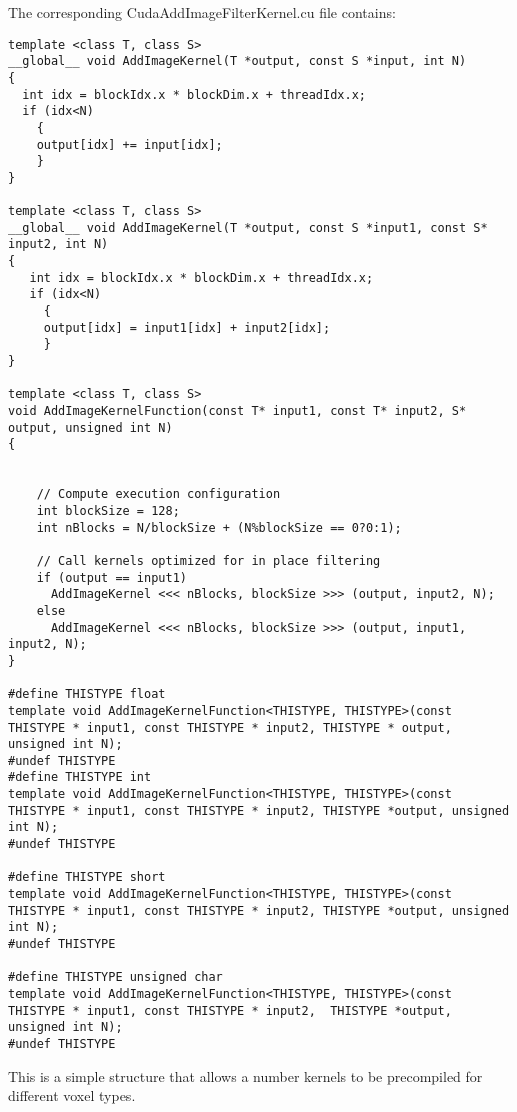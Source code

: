 \documentclass{InsightArticle}
\begin{document}
The corresponding CudaAddImageFilterKernel.cu file contains:
\begin{verbatim}
template <class T, class S>
__global__ void AddImageKernel(T *output, const S *input, int N)
{
  int idx = blockIdx.x * blockDim.x + threadIdx.x;
  if (idx<N) 
    {
    output[idx] += input[idx];
    }
}

template <class T, class S>
__global__ void AddImageKernel(T *output, const S *input1, const S* input2, int N)
{
   int idx = blockIdx.x * blockDim.x + threadIdx.x;
   if (idx<N) 
     {
     output[idx] = input1[idx] + input2[idx];
     }
}

template <class T, class S>
void AddImageKernelFunction(const T* input1, const T* input2, S* output, unsigned int N)
{


    // Compute execution configuration 
    int blockSize = 128;
    int nBlocks = N/blockSize + (N%blockSize == 0?0:1);

    // Call kernels optimized for in place filtering
    if (output == input1)
      AddImageKernel <<< nBlocks, blockSize >>> (output, input2, N);
    else
      AddImageKernel <<< nBlocks, blockSize >>> (output, input1, input2, N);
}

#define THISTYPE float
template void AddImageKernelFunction<THISTYPE, THISTYPE>(const THISTYPE * input1, const THISTYPE * input2, THISTYPE * output, unsigned int N);
#undef THISTYPE
#define THISTYPE int
template void AddImageKernelFunction<THISTYPE, THISTYPE>(const THISTYPE * input1, const THISTYPE * input2, THISTYPE *output, unsigned int N);
#undef THISTYPE

#define THISTYPE short
template void AddImageKernelFunction<THISTYPE, THISTYPE>(const THISTYPE * input1, const THISTYPE * input2, THISTYPE *output, unsigned int N);
#undef THISTYPE

#define THISTYPE unsigned char
template void AddImageKernelFunction<THISTYPE, THISTYPE>(const THISTYPE * input1, const THISTYPE * input2,  THISTYPE *output, unsigned int N);
#undef THISTYPE

\end{verbatim}

This is a simple structure that allows a number kernels to be precompiled for different voxel types.


%

\nocite{ITKSoftwareGuide}
\end{document}
